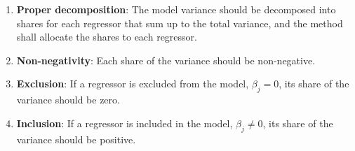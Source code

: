 \begin{enumerate}
    \label{list:criteria}
    \item \textbf{Proper decomposition}: The model variance should be decomposed into shares for each regressor that sum up to the total variance, and the method shall allocate the shares to each regressor.
    \item \textbf{Non-negativity}: Each share of the variance should be non-negative.
    \item \textbf{Exclusion}: If a regressor is excluded from the model, $\beta_j=0$, its share of the variance should be zero.
    \item \textbf{Inclusion}: If a regressor is included in the model, $\beta_j \neq 0$, its share of the variance should be positive.
\end{enumerate}
